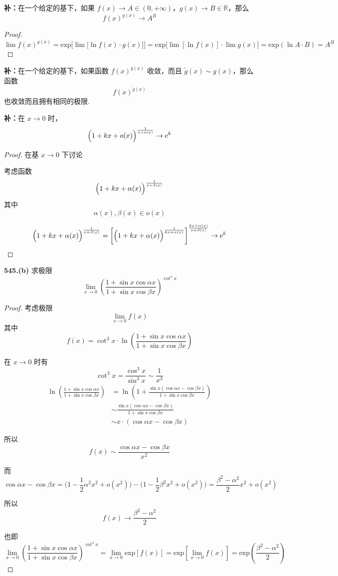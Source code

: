 \textbf{补：}在一个给定的基下，如果 $f(x) \rightarrow A \in (0, +\infty)$，$g(x) \rightarrow B \in \mathbb{R}$，那么
\[f(x)^{g(x)} \rightarrow A^B\]
\begin{proof}
    \[\lim f(x)^{g(x)} = \mathrm{exp} \biggl[\lim \bigl[\ln f(x) \cdot g(x)\bigr]\biggr] = \mathrm{exp}\biggl[\lim [\ln f(x)] \cdot \lim g(x)\biggr] = \mathrm{exp}(\ln A \cdot B) = A^B\]
\end{proof}

\textbf{补：}在一个给定的基下，如果函数 $\displaystyle f(x)^{g(x)}$ 收敛，而且 $\tilde{g}(x) \sim g(x)$，那么函数
\[f(x)^{\tilde{g}(x)}\]
也收敛而且拥有相同的极限.

\textbf{补：}在 $x \rightarrow 0$ 时，
\[\Bigl(1 + kx + o(x)\Bigr)^{\frac{1}{x + o(x)}} \rightarrow \mathrm{e}^k\]
\begin{proof}
    在基 $x \rightarrow 0$ 下讨论
    
    考虑函数
    \[\Bigl(1 + kx + \alpha(x)\Bigr)^{\frac{1}{x + \beta(x)}}\]
    其中
    \[\alpha(x), \beta(x) \in o(x)\]

    \[\Bigl(1 + kx + \alpha(x)\Bigr)^{\frac{1}{x + \beta(x)}} = \bigg[\Bigl(1 + kx + \alpha(x)\Bigr)^{\frac{1}{kx + \alpha(x)}}\bigg]^{\frac{kx + \alpha(x)}{x + \beta(x)}} \rightarrow \mathrm{e}^k\]
\end{proof}\vspace{9pt}

\textbf{545.(b)} 求极限
\[\lim_{x \rightarrow 0} \left(\frac{1 + \sin x \cos \alpha x}{1 + \sin x \cos \beta x}\right)^{\cot^3 x}\]
\begin{proof}
    考虑极限
    \[\lim_{x \rightarrow 0} f(x)\]
    其中
    \[f(x) = \cot^3 x \cdot \ln \left(\frac{1 + \sin x \cos \alpha x}{1 + \sin x \cos \beta x}\right)\]

    在 $x \rightarrow 0$ 时有
    \[\cot^3 x = \frac{\cos^3 x}{\sin^3 x} \sim \frac{1}{x^3}\]
    \begin{align*}
        \ln \left(\frac{1 + \sin x \cos \alpha x}{1 + \sin x \cos \beta x}\right) &= \ln \left(1 + \frac{\sin x (\cos \alpha x - \cos \beta x)}{1 + \sin x \cos \beta x}\right)\\
        &\sim \frac{\sin x(\cos \alpha x - \cos \beta x)}{1 + \sin x \cos \beta x}\\
        &\sim x \cdot (\cos \alpha x - \cos \beta x)
    \end{align*}

    所以
    \[f(x) \sim \frac{\cos \alpha x - \cos \beta x}{x^2}\]

    而
    \[\cos \alpha x - \cos \beta x = \biggl(1 - \frac{1}{2}\alpha^2 x^2 + o(x^2)\biggr) - \biggl(1 - \frac{1}{2}\beta^2 x^2 + o(x^2)\biggr) = \frac{\beta^2 - \alpha^2}{2}x^2 + o(x^2)\]

    所以
    \[f(x) \rightarrow \frac{\beta^2 - \alpha^2}{2}\]

    也即
    \[\lim_{x \rightarrow 0} \left(\frac{1 + \sin x \cos \alpha x}{1 + \sin x \cos \beta x}\right)^{\cot^3 x} = \lim_{x \rightarrow 0} \mathrm{exp}[f(x)] = \mathrm{exp}\left[\lim_{x \rightarrow 0} f(x)\right] = \mathrm{exp}\left(\frac{\beta^2 - \alpha^2}{2}\right)\]
\end{proof}\vspace{9pt}

